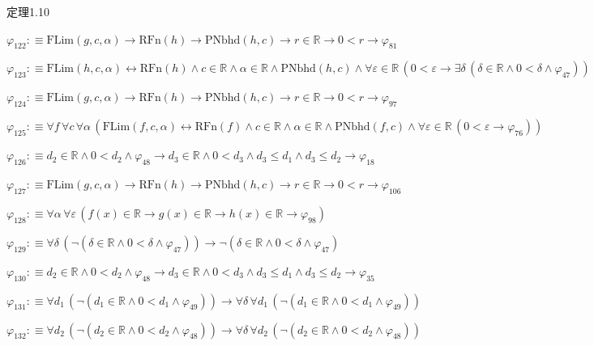 \begin{fullproof}{定理1.10}
\begin{abbrevlist}
\item $\varphi_{122} :\equiv \mathrm{FLim}(g,c,\alpha) \to \mathrm{RFn}(h) \to \mathrm{PNbhd}(h,c) \to r \in \mathbb{R} \to 0 < r \to \varphi_{81}$
\item $\varphi_{123} :\equiv \mathrm{FLim}(h,c,\alpha) \leftrightarrow \mathrm{RFn}(h) \land c \in \mathbb{R} \land \alpha \in \mathbb{R} \land \mathrm{PNbhd}(h,c) \land \forall \varepsilon \in \mathbb{R}\,(0 < \varepsilon \to \exists \delta\,(\delta \in \mathbb{R} \land 0 < \delta \land \varphi_{47}))$
\item $\varphi_{124} :\equiv \mathrm{FLim}(g,c,\alpha) \to \mathrm{RFn}(h) \to \mathrm{PNbhd}(h,c) \to r \in \mathbb{R} \to 0 < r \to \varphi_{97}$
\item $\varphi_{125} :\equiv \forall f\,\forall c\,\forall \alpha\,(\mathrm{FLim}(f,c,\alpha) \leftrightarrow \mathrm{RFn}(f) \land c \in \mathbb{R} \land \alpha \in \mathbb{R} \land \mathrm{PNbhd}(f,c) \land \forall \varepsilon \in \mathbb{R}\,(0 < \varepsilon \to \varphi_{76}))$
\item $\varphi_{126} :\equiv d_{2} \in \mathbb{R} \land 0 < d_{2} \land \varphi_{48} \to d_{3} \in \mathbb{R} \land 0 < d_{3} \land d_{3} \leq d_{1} \land d_{3} \leq d_{2} \to \varphi_{18}$
\item $\varphi_{127} :\equiv \mathrm{FLim}(g,c,\alpha) \to \mathrm{RFn}(h) \to \mathrm{PNbhd}(h,c) \to r \in \mathbb{R} \to 0 < r \to \varphi_{106}$
\item $\varphi_{128} :\equiv \forall \alpha\,\forall \varepsilon\,(f(x) \in \mathbb{R} \to g(x) \in \mathbb{R} \to h(x) \in \mathbb{R} \to \varphi_{98})$
\item $\varphi_{129} :\equiv \forall \delta\,(\neg (\delta \in \mathbb{R} \land 0 < \delta \land \varphi_{47})) \to \neg (\delta \in \mathbb{R} \land 0 < \delta \land \varphi_{47})$
\item $\varphi_{130} :\equiv d_{2} \in \mathbb{R} \land 0 < d_{2} \land \varphi_{48} \to d_{3} \in \mathbb{R} \land 0 < d_{3} \land d_{3} \leq d_{1} \land d_{3} \leq d_{2} \to \varphi_{35}$
\item $\varphi_{131} :\equiv \forall d_{1}\,(\neg (d_{1} \in \mathbb{R} \land 0 < d_{1} \land \varphi_{49})) \to \forall \delta\,\forall d_{1}\,(\neg (d_{1} \in \mathbb{R} \land 0 < d_{1} \land \varphi_{49}))$
\item $\varphi_{132} :\equiv \forall d_{2}\,(\neg (d_{2} \in \mathbb{R} \land 0 < d_{2} \land \varphi_{48})) \to \forall \delta\,\forall d_{2}\,(\neg (d_{2} \in \mathbb{R} \land 0 < d_{2} \land \varphi_{48}))$

\end{abbrevlist}
\end{fullproof}
